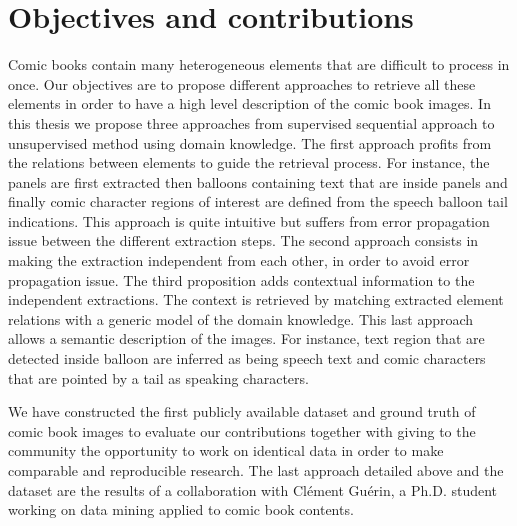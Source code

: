 \section{Objectives and contributions}
Comic books contain many heterogeneous elements that are difficult to process in once.
Our objectives are to propose different approaches to retrieve all these elements in order to have a high level description of the comic book images.
In this thesis we propose three approaches from supervised sequential approach to unsupervised method using domain knowledge. 
The first approach profits from the relations between elements to guide the retrieval process.
For instance, the panels are first extracted then balloons containing text that are inside panels and finally comic character regions of interest are defined from the speech balloon tail indications.
This approach is quite intuitive but suffers from error propagation issue between the different extraction steps.
The second approach consists in making the extraction independent from each other, in order to avoid error propagation issue.
The third proposition adds contextual information to the independent extractions.
The context is retrieved by matching extracted element relations with a generic model of the domain knowledge.
This last approach allows a semantic description of the images.
For instance, text region that are detected inside balloon are inferred as being speech text and comic characters that are pointed by a tail as speaking characters.

We have constructed the first publicly available dataset and ground truth of comic book images to evaluate our contributions together with giving to the community the opportunity to work on identical data in order to make comparable and reproducible research.
The last approach detailed above and the dataset are the results of a collaboration with Cl{\'e}ment Gu{\'e}rin, a Ph.D. student working on data mining applied to comic book contents.

